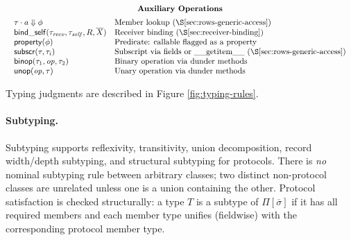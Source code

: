 \begin{figure*}[t]
\[\begin{array}{c}
\textbf{Auxiliary Operations} \\[0.5em]
\begin{array}{ll}
\tau \cdot a \Downarrow \phi & \text{Member lookup (\S\ref{sec:rows-generic-access})} \\
\mathsf{bind\_self}(\tau_{\mathit{recv}}, \tau_{\mathit{self}}, R, \overline{X}) & \text{Receiver binding (\S\ref{sec:receiver-binding})} \\
\mathsf{property}(\phi) & \text{Predicate: callable flagged as a property} \\
\mathsf{subscr}(\tau, \tau_i) & \text{Subscript via fields or \_\_getitem\_\_ (\S\ref{sec:rows-generic-access})} \\
\mathsf{binop}(\tau_1, \mathit{op}, \tau_2) & \text{Binary operation via dunder methods} \\
\mathsf{unop}(\mathit{op}, \tau) & \text{Unary operation via dunder methods}
\end{array}
\end{array}
\]
\caption{Expression typing rules and row-level application. Constructor calls follow the same scheme after resolving the constructor protocol (e.g., \(\mathtt{\_\_init\_\_}\)). Effects are forwarded to the reduced product domain; the relation here returns only types.}
\label{fig:typing-rules}
\end{figure*}

Typing judgments are described in Figure \ref{fig:typing-rules}.

\paragraph{Subtyping.}  
Subtyping supports reflexivity, transitivity, union decomposition, record width/depth subtyping, and structural subtyping for protocols.  
There is \emph{no} nominal subtyping rule between arbitrary classes; two distinct non-protocol classes are unrelated unless one is a union containing the other.  
Protocol satisfaction is checked structurally: a type $T$ is a subtype of $\Pi[\overline{\sigma}]$ if it has all required members and each member type unifies (fieldwise) with the corresponding protocol member type.


